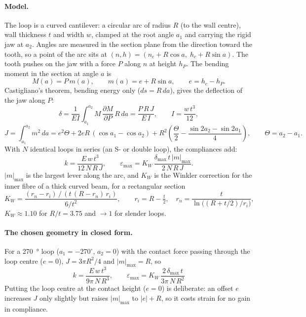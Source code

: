 \paragraph{Model.} The loop is a curved cantilever: a circular arc of radius $R$ (to the wall
centre), wall thickness $t$ and width $w$, clamped at the root angle $a_1$ and carrying the rigid
jaw at $a_2$. Angles are measured in the section plane from the direction toward the tooth, so a
point of the arc sits at $(n,h) = (n_c+R\cos a,\; h_c+R\sin a)$. The tooth pushes on the jaw with a
force $P$ along $n$ at height $h_P$. The bending moment in the section at angle $a$ is
\begin{equation}
M(a) = P\,m(a),\qquad m(a) = e + R\sin a,\qquad e = h_c - h_P .
\end{equation}
Castigliano's theorem, bending energy only ($ds = R\,da$), gives the deflection of the jaw along $P$:
\begin{equation}
\delta = \frac{1}{EI}\int_{a_1}^{a_2} M\,\frac{\partial M}{\partial P}\,R\,da = \frac{P\,R\,J}{E\,I},
\qquad I=\frac{w\,t^3}{12},
\end{equation}
\begin{equation}
J = \int_{a_1}^{a_2} m^2\,da = e^2\Theta + 2eR\,(\cos a_1-\cos a_2) + R^2\left(\frac{\Theta}{2}-\frac{\sin 2a_2-\sin 2a_1}{4}\right),
\qquad \Theta = a_2-a_1 .
\label{eq:J}
\end{equation}
With $N$ identical loops in series (an S- or double loop), the compliances add:
\begin{equation}
k = \frac{E\,w\,t^3}{12\,N\,R\,J},\qquad
\varepsilon_\text{max} = K_W\,\frac{\delta_\text{max}\,t\,|m|_\text{max}}{2\,N\,R\,J}.
\label{eq:loop}
\end{equation}
$|m|_\text{max}$ is the largest lever along the arc, and $K_W$ is the Winkler correction for the
inner fibre of a thick curved beam, for a rectangular section
\begin{equation}
K_W = \frac{(r_n-r_i)\,/\,(t\,(R-r_n)\,r_i)}{6/t^2},\qquad r_i = R-\tfrac{t}{2},\quad r_n = \frac{t}{\ln\!\big((R+t/2)/r_i\big)} ,
\end{equation}
$K_W\approx1.10$ for $R/t=3.75$ and $\to1$ for slender loops.

\paragraph{The chosen geometry in closed form.} For a \SI{270}{\degree} loop ($a_1=-270^\circ$,
$a_2=0$) with the contact force passing through the loop centre ($e=0$), $J=3\pi R^2/4$ and
$|m|_\text{max}=R$, so
\begin{equation}
\boxed{\;k = \frac{E\,w\,t^3}{9\pi\,N\,R^3},\qquad \varepsilon_\text{max} = K_W\,\frac{2\,\delta_\text{max}\,t}{3\pi\,N\,R^2}\;}
\label{eq:loopbox}
\end{equation}
Putting the loop centre at the contact height ($e=0$) is deliberate: an offset $e$ increases $J$
only slightly but raises $|m|_\text{max}$ to $|e|+R$, so it costs strain for no gain in compliance.

